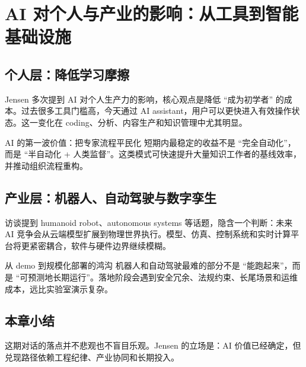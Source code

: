 \section{AI 对个人与产业的影响：从工具到智能基础设施}

\subsection{个人层：降低学习摩擦}

Jensen 多次提到 AI 对个人生产力的影响，核心观点是降低 ``成为初学者'' 的成本。过去很多工具门槛高，今天通过 AI assistant，用户可以更快进入有效操作状态。这一变化在 coding、分析、内容生产和知识管理中尤其明显。

\begin{importantbox}{AI 的第一波价值：把专家流程平民化}
短期内最稳定的收益不是 ``完全自动化''，而是 ``半自动化 + 人类监督''。这类模式可快速提升大量知识工作者的基线效率，并推动组织流程重构。
\end{importantbox}

\subsection{产业层：机器人、自动驾驶与数字孪生}

访谈提到 humanoid robot、autonomous systems 等话题，隐含一个判断：未来 AI 竞争会从云端模型扩展到物理世界执行。模型、仿真、控制系统和实时计算平台将更紧密耦合，软件与硬件边界继续模糊。

\begin{warningbox}{从 demo 到规模化部署的鸿沟}
机器人和自动驾驶最难的部分不是 ``能跑起来''，而是 ``可预测地长期运行''。落地阶段会遇到安全冗余、法规约束、长尾场景和运维成本，远比实验室演示复杂。
\end{warningbox}

\subsection{本章小结}

这期对话的落点并不悲观也不盲目乐观。Jensen 的立场是：AI 价值已经确定，但兑现路径依赖工程纪律、产业协同和长期投入。

